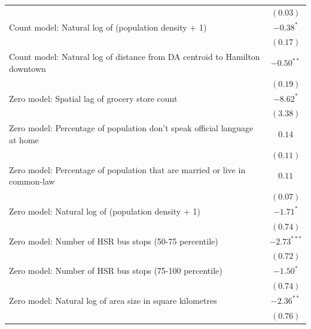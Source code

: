 \documentclass[preprint, 3p,
authoryear]{elsarticle} %
\begin{document}
\begin{table}
\begin{center}
\begin{footnotesize}
\begin{tabular}{l c}
                                                                              & $(0.03)$        \\
Count model: Natural log of (population density + 1)                          & $-0.38^{*}$     \\
                                                                              & $(0.17)$        \\
Count model: Natural log of distance from DA centroid to Hamilton downtown    & $-0.50^{**}$    \\
                                                                              & $(0.19)$        \\
Zero model: Spatial lag of grocery store count                                & $-8.62^{*}$     \\
                                                                              & $(3.38)$        \\
Zero model: Percentage of population don't speak official language at home    & $0.14$          \\
                                                                              & $(0.11)$        \\
Zero model: Percentage of population that are married or live in common-law   & $0.11$          \\
                                                                              & $(0.07)$        \\
Zero model: Natural log of (population density + 1)                           & $-1.71^{*}$     \\
                                                                              & $(0.74)$        \\
Zero model: Number of HSR bus stops (50-75 percentile)                        & $-2.73^{***}$   \\
                                                                              & $(0.72)$        \\
Zero model: Number of HSR bus stops (75-100 percentile)                       & $-1.50^{*}$     \\
                                                                              & $(0.74)$        \\
Zero model: Natural log of area size in square kilometres                     & $-2.36^{**}$    \\
                                                                              & $(0.76)$        \\

\end{tabular}
\end{footnotesize}
\end{center}
\end{table}
\end{document}
